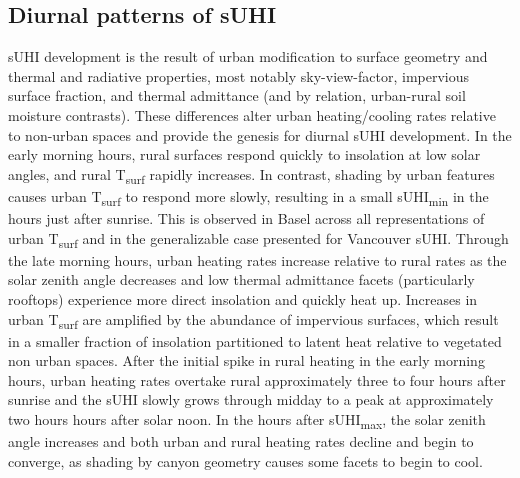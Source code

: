 \begin{bibunit}
\subsection{Diurnal patterns of sUHI}
\label{gen}

sUHI development is the result of urban modification to surface geometry and thermal and radiative properties, most notably sky-view-factor, impervious surface fraction, and thermal admittance (and by relation, urban-rural soil moisture contrasts). These differences alter urban heating/cooling rates relative to non-urban spaces and provide the genesis for diurnal sUHI development. In the early morning hours, rural surfaces respond quickly to insolation at low solar angles, and rural T\textsubscript{surf} rapidly increases. In contrast, shading by urban features causes urban T\textsubscript{surf} to respond more slowly, resulting in a small sUHI\textsubscript{min} in the hours just after sunrise. This is observed in Basel across all representations of urban T\textsubscript{surf} and in the generalizable case presented for Vancouver sUHI. Through the late morning hours, urban heating rates increase relative to rural rates as the solar zenith angle decreases and low thermal admittance facets (particularly rooftops) experience more direct insolation and quickly heat up. Increases in urban T\textsubscript{surf} are amplified by the abundance of impervious surfaces, which result in a smaller fraction of insolation partitioned to latent heat relative to vegetated non urban spaces. After the initial spike in rural heating in the early morning hours, urban heating rates overtake rural approximately three to four hours after sunrise and the sUHI slowly grows through midday to a peak at approximately two hours hours after solar noon. In the hours after sUHI\textsubscript{max}, the solar zenith angle increases and both urban and rural heating rates decline and begin to converge, as shading by canyon geometry causes some facets to begin to cool.


\end{bibunit}
